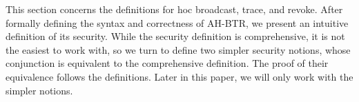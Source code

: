 This section concerns the definitions for \ad hoc broadcast, trace, and revoke.
After formally defining the syntax and correctness of AH-BTR,
we present an intuitive definition of its security.
While the security definition is comprehensive,
it is not the easiest to work with, so
we turn to define two simpler security notions, whose conjunction is equivalent to the comprehensive definition.
The proof of their equivalence follows the definitions.
Later in this paper, we will only work with the simpler notions.
